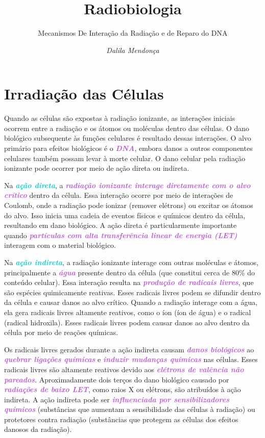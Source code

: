 \documentclass[11pt,a4paper]{article}
\title{\LobsterTwo\Huge{Radiobiologia}}
\author{\LobsterTwo\Large{Mecanismos De Interação da Radiação e de Reparo do DNA}\nocite{*}}
\date{\LobsterTwo\textit{Dalila Mendonça}}
\begin{document}
	\maketitle


\section{Irradiação das Células}

	Quando as células são expostas à radiação ionizante, as interações iniciais ocorrem entre a radiação e os átomos ou moléculas dentro das células. O dano biológico subsequente às funções celulares é resultado dessas interações. O alvo primário para efeitos biológicos é o \textcolor{MediumOrchid}{\textbf{\textit{DNA}}}, embora danos a outros componentes celulares também possam levar à morte celular. O dano celular pela radiação ionizante pode ocorrer por meio de ação direta ou indireta.

	Na \textcolor{DarkTurquoise}{\textbf{\textit{ação direta}}}, a \textcolor{MediumOrchid}{\textbf{\textit{radiação ionizante interage diretamente com o alvo crítico}}} dentro da célula. Essa interação ocorre por meio de interações de Coulomb, onde a radiação pode ionizar (remover elétrons) ou excitar os átomos do alvo. Isso inicia uma cadeia de eventos físicos e químicos dentro da célula, resultando em dano biológico. A ação direta é particularmente importante quando \textcolor{MediumOrchid}{\textbf{\textit{partículas com alta transferência linear de energia (LET)}}} interagem com o material biológico.

	Na \textcolor{DarkTurquoise}{\textbf{\textit{ação indireta}}}, a radiação ionizante interage com outras moléculas e átomos, principalmente a \textcolor{MediumOrchid}{\textbf{\textit{água}}} presente dentro da célula (que constitui cerca de 80\% do conteúdo celular). Essa interação resulta na \textcolor{MediumOrchid}{\textbf{\textit{produção de radicais livres}}}, que são espécies quimicamente reativas. Esses radicais livres podem se difundir dentro da célula e causar danos ao alvo crítico. Quando a radiação interage com a água, ela gera radicais livres altamente reativos, como o íon  (íon de água) e o radical  (radical hidroxila). Esses radicais livres podem causar danos ao alvo dentro da célula por meio de reações químicas.

	Os radicais livres gerados durante a ação indireta causam \textcolor{MediumOrchid}{\textbf{\textit{danos biológicos}}} ao\textcolor{MediumOrchid}{\textbf{\textit{ quebrar ligações químicas}}} e \textcolor{MediumOrchid}{\textbf{\textit{induzir mudanças químicas}}} nas células. Esses radicais livres são altamente reativos devido aos \textcolor{MediumOrchid}{\textbf{\textit{elétrons de valência não pareados}}}. Aproximadamente dois terços do dano biológico causado por \textcolor{MediumOrchid}{\textbf{\textit{radiações de baixo LET}}}, como raios X ou elétrons, são atribuídos à ação indireta. A ação indireta pode ser \textcolor{MediumOrchid}{\textbf{\textit{influenciada por sensibilizadores químicos}}} (substâncias que aumentam a sensibilidade das células à radiação) ou protetores contra radiação (substâncias que protegem as células dos efeitos danosos da radiação).
\end{document}
